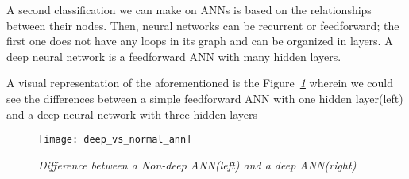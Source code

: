 \vspace{0.5cm}
A second classification we can make on ANNs is based on the relationships between their nodes.
Then, neural networks can be recurrent or feedforward;
the first one does not have any loops in its graph and can be organized in layers.
A deep neural network is a feedforward ANN with many hidden layers.
\vspace{5cm}

A visual representation of the aforementioned is the Figure\emph{~\ref{fig:deep_vs_normal}} wherein we could see
the differences between a simple feedforward ANN with one hidden layer(left) and a deep neural network with three
hidden layers
\begin{figure}[h]
    \centering
    \texttt{[image: deep\_vs\_normal\_ann]}
    \caption{\emph{Difference between a Non-deep ANN(left) and a deep ANN(right) \cite{deepLearningBook}}}
    \label{fig:deep_vs_normal}
\end{figure}

